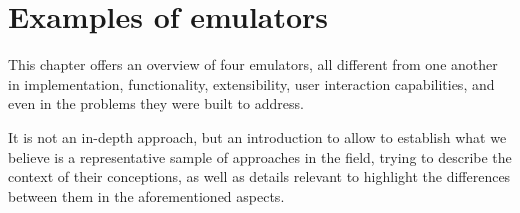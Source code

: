 
\chapter{Examples of emulators}
\label{ch:examplesofemulators}

This chapter offers an overview of four emulators, all different from one another in implementation, functionality, extensibility, user interaction capabilities, and even in the problems they were built to address.

It is not an in-depth approach, but an introduction to allow to establish what we believe is a representative sample of approaches in the field, trying to describe the context of their conceptions, as well as details relevant to highlight the differences between them in the aforementioned aspects.









